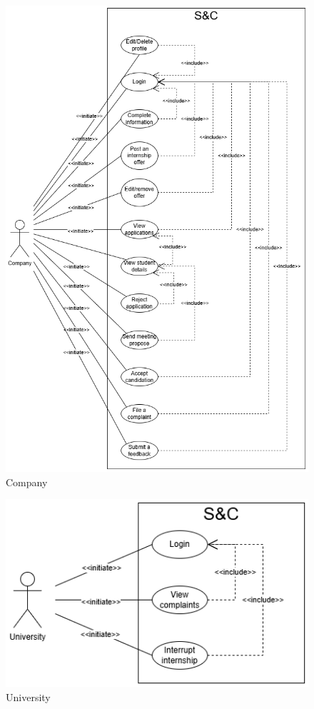 \begin{figure}[H]
    \centering
    \includegraphics[width=0.9\linewidth]{Images/use case diagrams/COMPANY.png}
    \caption{Company}
    \label{fig:enter-label}
\end{figure}

\begin{figure}[H]
    \centering
    \includegraphics[width=1\linewidth]{Images/use case diagrams/UNIVERSITY.png}
    \caption{University}
    \label{fig:enter-label}
\end{figure}

